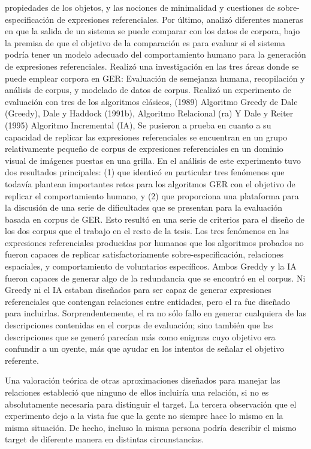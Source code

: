 propiedades de los objetos, y las nociones de minimalidad y cuestiones de sobre-especificaci\'on de expresiones referenciales. Por \'ultimo, analiz\'o diferentes maneras en que la salida de un sistema se puede
comparar con los datos de corpora, bajo la premisa de que el objetivo de la comparaci\'on es
para evaluar si el sistema podr\'ia tener un modelo adecuado del comportamiento humano para la generaci\'on de expresiones referenciales.
Realiz\'o una investigaci\'on en las tres \'areas donde se puede emplear corpora en GER: Evaluaci\'on de semejanza humana, recopilaci\'on y an\'alisis de corpus, y modelado de datos de corpus. Realiz\'o un experimento de evaluaci\'on con tres de los algoritmos cl\'asicos, (1989) Algoritmo Greedy de Dale (Greedy), Dale y Haddock (1991b), Algoritmo Relacional (ra) Y Dale y Reiter (1995) Algoritmo Incremental (IA), Se pusieron a prueba en cuanto a su capacidad de
replicar las expresiones referenciales se encuentran en un grupo relativamente peque\~no de corpus de expresiones referenciales
en un dominio visual de im\'agenes puestas en una grilla.
En el an\'alisis de este experimento tuvo dos resultados principales: (1) que identic\'o en particular tres 
fen\'omenos que todav\'ia plantean importantes retos para los algoritmos GER con el objetivo de replicar
el comportamiento humano, y (2) que proporciona una plataforma para la discusi\'on de una serie de
dificultades que se presentan para la evaluaci\'on basada en corpus de GER. Esto result\'o en una serie
de criterios para el dise\~no de los dos corpus que el trabajo en el resto de la tesis.
Los tres fen\'omenos en las expresiones referenciales producidas por humanos que los
algoritmos probados no fueron capaces de replicar satisfactoriamente sobre-especificaci\'on,
relaciones espaciales, y comportamiento de voluntarios espec\'ificos. Ambos
Greddy y la IA fueron capaces de generar algo de la redundancia que se encontr\'o en el corpus.
 Ni Greedy ni el IA estaban dise\~nados para ser capaz de generar expresiones referenciales que contengan relaciones entre entidades, pero el ra fue dise\~nado para incluirlas. Sorprendentemente, el
ra no s\'olo fallo en generar cualquiera de las descripciones contenidas en el corpus de evaluaci\'on; sino tambi\'en que las descripciones que se gener\'o parec\'ian m\'as como enigmas cuyo objetivo era confundir a un oyente, m\'as que ayudar en
los intentos de se\~nalar el objetivo referente. 

Una valoraci\'on te\'orica de otras aproximaciones dise\~nados para manejar las relaciones estableci\'o que ninguno de ellos incluir\'ia una relaci\'on, si no es absolutamente necesaria para distinguir el target.
La tercera observaci\'on que el experimento dejo a la vista fue que la gente no siempre hace lo mismo en la misma situaci\'on. De hecho, incluso la misma persona podr\'ia describir el mismo target de diferente manera en distintas
circunstancias. 

